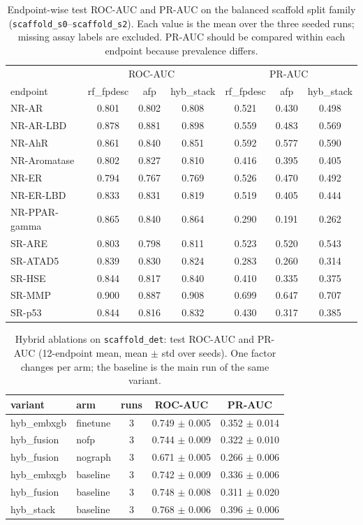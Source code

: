 \begin{table}[t]
\centering
\caption{Endpoint-wise test ROC-AUC and PR-AUC on the balanced scaffold split family (\texttt{scaffold\_s0}--\texttt{scaffold\_s2}). Each value is the mean over the three seeded runs; missing assay labels are excluded. PR-AUC should be compared within each endpoint because prevalence differs.}
\label{tab:hybrid-endpoint}
\small
\begin{tabular}{lcccccc}
\toprule
 & \multicolumn{3}{c}{ROC-AUC} & \multicolumn{3}{c}{PR-AUC} \\
endpoint & rf\_fpdesc & afp & hyb\_stack & rf\_fpdesc & afp & hyb\_stack \\
\midrule
NR-AR & 0.801 & 0.802 & 0.808 & 0.521 & 0.430 & 0.498 \\
NR-AR-LBD & 0.878 & 0.881 & 0.898 & 0.559 & 0.483 & 0.569 \\
NR-AhR & 0.861 & 0.840 & 0.851 & 0.592 & 0.577 & 0.590 \\
NR-Aromatase & 0.802 & 0.827 & 0.810 & 0.416 & 0.395 & 0.405 \\
NR-ER & 0.794 & 0.767 & 0.769 & 0.526 & 0.470 & 0.492 \\
NR-ER-LBD & 0.833 & 0.831 & 0.819 & 0.519 & 0.405 & 0.444 \\
NR-PPAR-gamma & 0.865 & 0.840 & 0.864 & 0.290 & 0.191 & 0.262 \\
SR-ARE & 0.803 & 0.798 & 0.811 & 0.523 & 0.520 & 0.543 \\
SR-ATAD5 & 0.839 & 0.830 & 0.824 & 0.283 & 0.260 & 0.314 \\
SR-HSE & 0.844 & 0.817 & 0.840 & 0.410 & 0.335 & 0.375 \\
SR-MMP & 0.900 & 0.887 & 0.908 & 0.699 & 0.647 & 0.707 \\
SR-p53 & 0.844 & 0.816 & 0.832 & 0.430 & 0.317 & 0.385 \\
\bottomrule
\end{tabular}
\end{table}

\begin{table}[t]
\centering
\caption{Hybrid ablations on \texttt{scaffold\_det}: test ROC-AUC and PR-AUC (12-endpoint mean, mean $\pm$ std over seeds). One factor changes per arm; the baseline is the main run of the same variant.}
\label{tab:hybrid-ablation}
\scriptsize
\begin{tabular}{llccc}
\toprule
variant & arm & runs & ROC-AUC & PR-AUC \\
\midrule
hyb\_embxgb & finetune & 3 & 0.749 $\pm$ 0.005 & 0.352 $\pm$ 0.014 \\
hyb\_fusion & nofp & 3 & 0.744 $\pm$ 0.009 & 0.322 $\pm$ 0.010 \\
hyb\_fusion & nograph & 3 & 0.671 $\pm$ 0.005 & 0.266 $\pm$ 0.006 \\
hyb\_embxgb & baseline & 3 & 0.742 $\pm$ 0.009 & 0.336 $\pm$ 0.006 \\
hyb\_fusion & baseline & 3 & 0.748 $\pm$ 0.008 & 0.311 $\pm$ 0.020 \\
hyb\_stack & baseline & 3 & 0.768 $\pm$ 0.006 & 0.396 $\pm$ 0.006 \\
\bottomrule
\end{tabular}
\end{table}

